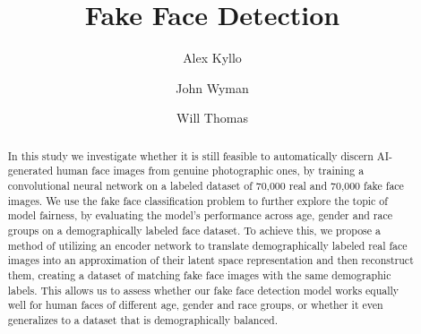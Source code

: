 \documentclass[11pt, letterpaper]{article}
\title{Fake Face Detection}
\author{
  Alex Kyllo
  \and
  John Wyman
  \and
  Will Thomas
}
\begin{document}
\maketitle

\begin{abstract}
  In this study we investigate whether it is still feasible to automatically
  discern AI-generated human face images from genuine photographic ones, by
  training a convolutional neural network on a labeled dataset of 70,000 real
  and 70,000 fake face images. We use the fake face classification problem to
  further explore the topic of model fairness, by evaluating the model's
  performance across age, gender and race groups on a demographically labeled
  face dataset. To achieve this, we propose a method of utilizing an encoder
  network to translate demographically labeled real face images into an
  approximation of their latent space representation and then reconstruct them,
  creating a dataset of matching fake face images with the same demographic
  labels. This allows us to assess whether our fake face detection model works
  equally well for human faces of different age, gender and race groups, or
  whether it even generalizes to a dataset that is demographically balanced.
\end{abstract}
\end{document}
